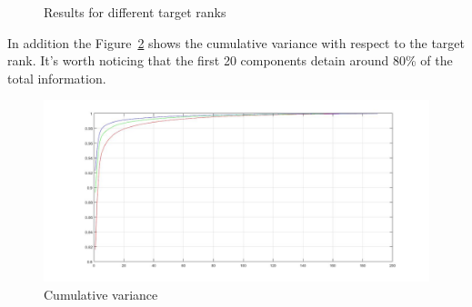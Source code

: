 \documentclass{article}
\begin{document}
\begin{figure}
    \centering

    \hfill

    \vspace{1em} %

    \hfill
    \label{fig:lr02}

    \caption{Results for different target ranks}
    \label{fig:group_of_four}
\end{figure}


In addition the Figure~\ref{fig:variance} shows the cumulative variance with respect to the target rank. It's worth noticing that the first 20 components detain around 80\% of the total information.
\begin{figure}[h]
    \centering
    \includegraphics[width=0.4\linewidth]{imagecomprvar.jpg}
    \caption{Cumulative variance}
    \label{fig:variance}
\end{figure}
\end{document}
